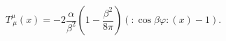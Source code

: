 \begin{equation}
T_{~\mu}^{\mu}(x)=-2\frac{\alpha}{\beta^{2}}\left(  1-\frac{\beta^{2}}{8\pi
}\right)  \left(  :\!\cos\beta\varphi\!:(x)-1\right)  .\label{T}%
\end{equation}

